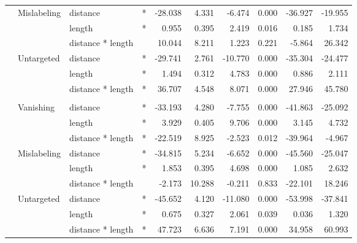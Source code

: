 \documentclass[
]{article}
\begin{document}
\begin{longtable}[t]{llllrrrrrr}
\hspace{1em} & Mislabeling & distance & * & -28.038 & 4.331 & -6.474 & 0.000 & -36.927 & -19.955\\
\cmidrule{3-10}\nopagebreak
\hspace{1em} &  & length & * & 0.955 & 0.395 & 2.419 & 0.016 & 0.185 & 1.734\\
\cmidrule{3-10}\nopagebreak
\hspace{1em} &  & distance * length &  & 10.044 & 8.211 & 1.223 & 0.221 & -5.864 & 26.342\\
\cmidrule{2-10}\nopagebreak
\hspace{1em} & Untargeted & distance & * & -29.741 & 2.761 & -10.770 & 0.000 & -35.304 & -24.477\\
\cmidrule{3-10}\nopagebreak
\hspace{1em} &  & length & * & 1.494 & 0.312 & 4.783 & 0.000 & 0.886 & 2.111\\
\cmidrule{3-10}\nopagebreak
\hspace{1em} &  & distance * length & * & 36.707 & 4.548 & 8.071 & 0.000 & 27.946 & 45.780\\
\cmidrule{1-10}\pagebreak[0]
\addlinespace[0.3em]
\multicolumn{10}{l}{\textbf{Cascade R-CNN}}\\
\hspace{1em} & Vanishing & distance & * & -33.193 & 4.280 & -7.755 & 0.000 & -41.863 & -25.092\\
\cmidrule{3-10}\nopagebreak
\hspace{1em} &  & length & * & 3.929 & 0.405 & 9.706 & 0.000 & 3.145 & 4.732\\
\cmidrule{3-10}\nopagebreak
\hspace{1em} &  & distance * length & * & -22.519 & 8.925 & -2.523 & 0.012 & -39.964 & -4.967\\
\cmidrule{2-10}\nopagebreak
\hspace{1em} & Mislabeling & distance & * & -34.815 & 5.234 & -6.652 & 0.000 & -45.560 & -25.047\\
\cmidrule{3-10}\nopagebreak
\hspace{1em} &  & length & * & 1.853 & 0.395 & 4.698 & 0.000 & 1.085 & 2.632\\
\cmidrule{3-10}\nopagebreak
\hspace{1em} &  & distance * length &  & -2.173 & 10.288 & -0.211 & 0.833 & -22.101 & 18.246\\
\cmidrule{2-10}\nopagebreak
\hspace{1em} & Untargeted & distance & * & -45.652 & 4.120 & -11.080 & 0.000 & -53.998 & -37.841\\
\cmidrule{3-10}\nopagebreak
\hspace{1em} &  & length & * & 0.675 & 0.327 & 2.061 & 0.039 & 0.036 & 1.320\\
\cmidrule{3-10}\nopagebreak
\hspace{1em} &  & distance * length & * & 47.723 & 6.636 & 7.191 & 0.000 & 34.958 & 60.993\\
\bottomrule
\end{longtable}
\endgroup{}
\end{document}

